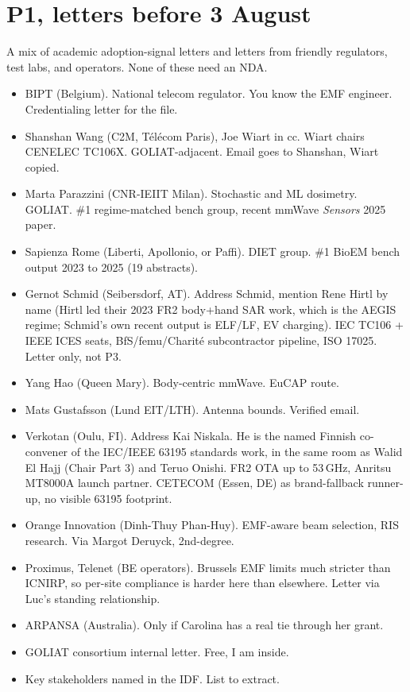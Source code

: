 \documentclass[11pt,a4paper]{article}
\begin{document}
\section{P1, letters before 3 August}
A mix of academic adoption-signal letters and letters from friendly regulators, test labs, and operators. None of these need an NDA.
\begin{itemize}
  \item BIPT (Belgium). National telecom regulator. You know the EMF engineer. Credentialing letter for the file.
  \item Shanshan Wang (C2M, T\'el\'ecom Paris), Joe Wiart in cc. Wiart chairs CENELEC TC106X. GOLIAT-adjacent. Email goes to Shanshan, Wiart copied.
  \item Marta Parazzini (CNR-IEIIT Milan). Stochastic and ML dosimetry. GOLIAT. \#1 regime-matched bench group, recent mmWave \emph{Sensors} 2025 paper.
  \item Sapienza Rome (Liberti, Apollonio, or Paffi). DIET group. \#1 BioEM bench output 2023 to 2025 (19 abstracts).
  \item Gernot Schmid (Seibersdorf, AT). Address Schmid, mention Rene Hirtl by name (Hirtl led their 2023 FR2 body+hand SAR work, which is the AEGIS regime; Schmid's own recent output is ELF/LF, EV charging). IEC TC106 + IEEE ICES seats, BfS/femu/Charit\'e subcontractor pipeline, ISO 17025. Letter only, not P3.
  \item Yang Hao (Queen Mary). Body-centric mmWave. EuCAP route.
  \item Mats Gustafsson (Lund EIT/LTH). Antenna bounds. Verified email.
  \item Verkotan (Oulu, FI). Address Kai Niskala. He is the named Finnish co-convener of the IEC/IEEE 63195 standards work, in the same room as Walid El Hajj (Chair Part 3) and Teruo Onishi. FR2 OTA up to 53\,GHz, Anritsu MT8000A launch partner. CETECOM (Essen, DE) as brand-fallback runner-up, no visible 63195 footprint.
  \item Orange Innovation (Dinh-Thuy Phan-Huy). EMF-aware beam selection, RIS research. Via Margot Deruyck, 2nd-degree.
  \item Proximus, Telenet (BE operators). Brussels EMF limits much stricter than ICNIRP, so per-site compliance is harder here than elsewhere. Letter via Luc's standing relationship.
  \item ARPANSA (Australia). Only if Carolina has a real tie through her grant.
  \item GOLIAT consortium internal letter. Free, I am inside.
  \item Key stakeholders named in the IDF. List to extract.
\end{itemize}
\end{document}
